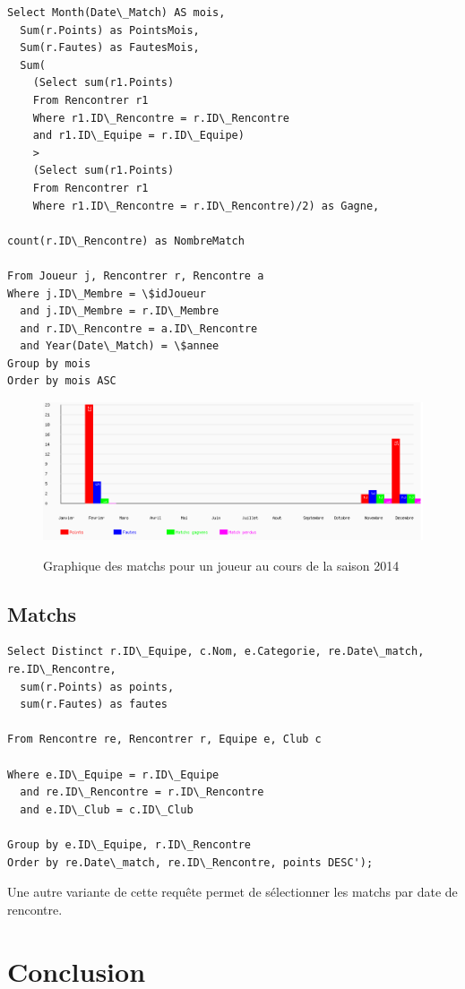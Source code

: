 \documentclass[a4paper»,8pt,french,fleqn]{report}
\begin{document}
\begin{lstlisting}
Select Month(Date\_Match) AS mois,
  Sum(r.Points) as PointsMois,
  Sum(r.Fautes) as FautesMois,
  Sum(
    (Select sum(r1.Points)
    From Rencontrer r1
    Where r1.ID\_Rencontre = r.ID\_Rencontre
    and r1.ID\_Equipe = r.ID\_Equipe)
    >
    (Select sum(r1.Points)
    From Rencontrer r1
    Where r1.ID\_Rencontre = r.ID\_Rencontre)/2) as Gagne,
    
count(r.ID\_Rencontre) as NombreMatch

From Joueur j, Rencontrer r, Rencontre a
Where j.ID\_Membre = \$idJoueur
  and j.ID\_Membre = r.ID\_Membre
  and r.ID\_Rencontre = a.ID\_Rencontre
  and Year(Date\_Match) = \$annee
Group by mois 
Order by mois ASC
\end{lstlisting}

\begin{figure}[h]
  \centering
    \includegraphics[scale=0.5]{graphe.png}
    \label{fig:graph}
    \caption{Graphique des matchs pour un joueur au cours de la saison 2014}
\end{figure}


\section{Matchs}

\begin{lstlisting}
Select Distinct r.ID\_Equipe, c.Nom, e.Categorie, re.Date\_match, re.ID\_Rencontre,
  sum(r.Points) as points, 
  sum(r.Fautes) as fautes 

From Rencontre re, Rencontrer r, Equipe e, Club c

Where e.ID\_Equipe = r.ID\_Equipe
  and re.ID\_Rencontre = r.ID\_Rencontre
  and e.ID\_Club = c.ID\_Club

Group by e.ID\_Equipe, r.ID\_Rencontre
Order by re.Date\_match, re.ID\_Rencontre, points DESC');
\end{lstlisting}

Une autre variante de cette requête permet de sélectionner les matchs par date de rencontre.

\chapter*{Conclusion}
\end{document}
